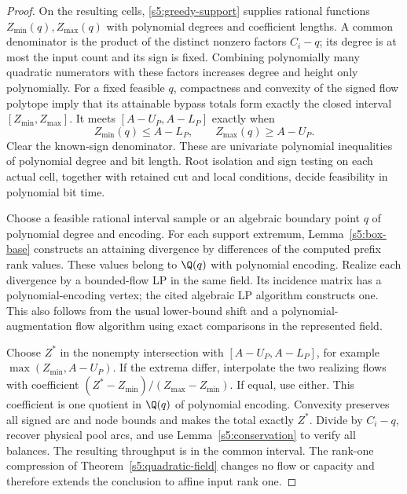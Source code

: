 \begin{proof}
On the resulting cells, \eqref{s5:greedy-support} supplies rational
functions $Z_{\min}(q),Z_{\max}(q)$ with polynomial degrees and
coefficient lengths. A common denominator is the product of the
distinct nonzero factors $C_i-q$; its degree is at most the input count
and its sign is fixed. Combining polynomially many quadratic numerators
with these factors increases degree and height only polynomially.
For a fixed feasible $q$, compactness and convexity of the signed flow
polytope imply that its attainable bypass totals form exactly the closed
interval $[Z_{\min},Z_{\max}]$. It meets $[A-U_P,A-L_P]$ exactly when
\begin{equation}
 Z_{\min}(q)\le A-L_P,\qquad Z_{\max}(q)\ge A-U_P.
 \label{s5:capacity-test}
\end{equation}
Clear the known-sign denominator. These are univariate polynomial
inequalities of polynomial degree and bit length. Root isolation and
sign testing on each actual cell, together with retained cut and local
conditions, decide feasibility in polynomial bit time.

Choose a feasible rational interval sample or an algebraic boundary
point $q$ of polynomial degree and encoding. For each support extremum,
Lemma~\ref{s5:box-base} constructs an attaining divergence by differences
of the computed prefix rank values. These values belong to $\Q(q)$
with polynomial encoding. Realize each divergence by a bounded-flow LP
in the same field. Its incidence matrix has a polynomial-encoding
vertex; the cited algebraic LP algorithm constructs one. This also
follows from the usual lower-bound shift and a polynomial-augmentation
flow algorithm using exact comparisons in the represented field.

Choose $Z^*$ in the nonempty intersection with $[A-U_P,A-L_P]$, for
example $\max(Z_{\min},A-U_P)$. If the extrema differ, interpolate the
two realizing flows with coefficient
$(Z^*-Z_{\min})/(Z_{\max}-Z_{\min})$. If equal, use either. This
coefficient is one quotient in $\Q(q)$ of polynomial encoding.
Convexity preserves all signed arc and node bounds and makes the total
exactly $Z^*$. Divide by $C_i-q$, recover physical pool arcs, and use
Lemma~\ref{s5:conservation} to verify all balances. The resulting
throughput is in the common interval. The rank-one compression of
Theorem~\ref{s5:quadratic-field} changes no flow or capacity and therefore
extends the conclusion to affine input rank one.
\end{proof}

